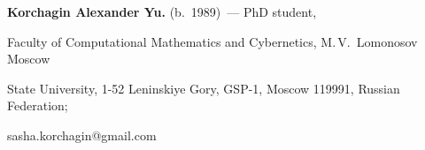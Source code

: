 \noindent


\textbf{Korchagin Alexander Yu.} (b.\ 1989)~--- PhD student,


Faculty of Computational Mathematics and Cybernetics, M.\,V.~Lomonosov Moscow


State University, 1-52  Leninskiye Gory, GSP-1, Moscow 119991, Russian Federation;


sasha.korchagin@gmail.com





 \label{end\stat}








\renewcommand{\bibname}{\protect\rm Литература} 